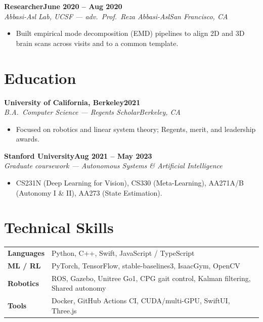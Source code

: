 \documentclass[10pt]{article}
\newcommand{\role}[4]{\textbf{#1}\hfill\textbf{#2}\\\textit{#3}\hfill\textit{#4}}
\begin{document}
\role{Researcher}{June 2020 -- Aug 2020}{Abbasi-Asl Lab, UCSF --- adv.\ Prof.\ Reza Abbasi-Asl}{San Francisco, CA}
\begin{itemize}
\item Built empirical mode decomposition (EMD) pipelines to align 2D and 3D brain scans across visits and to a common template.
\end{itemize}

\section*{Education}

\role{University of California, Berkeley}{2021}{B.A.\ Computer Science --- Regents Scholar}{Berkeley, CA}
\begin{itemize}
\item Focused on robotics and linear system theory; Regents, merit, and leadership awards.
\end{itemize}

\role{Stanford University}{Aug 2021 -- May 2023}{Graduate coursework --- Autonomous Systems \& Artificial Intelligence}{}
\begin{itemize}
\item CS231N (Deep Learning for Vision), CS330 (Meta-Learning), AA271A/B (Autonomy I \& II), AA273 (State Estimation).
\end{itemize}

\section*{Technical Skills}
\begin{tabular}{@{}p{0.9in}l}
\textbf{Languages} & Python, C++, Swift, JavaScript / TypeScript \\
\textbf{ML / RL} & PyTorch, TensorFlow, stable-baselines3, IsaacGym, OpenCV \\
\textbf{Robotics} & ROS, Gazebo, Unitree Go1, CPG gait control, Kalman filtering, Shared autonomy \\
\textbf{Tools} & Docker, GitHub Actions CI, CUDA/multi-GPU, SwiftUI, Three.js \\
\end{tabular}
\end{document}
